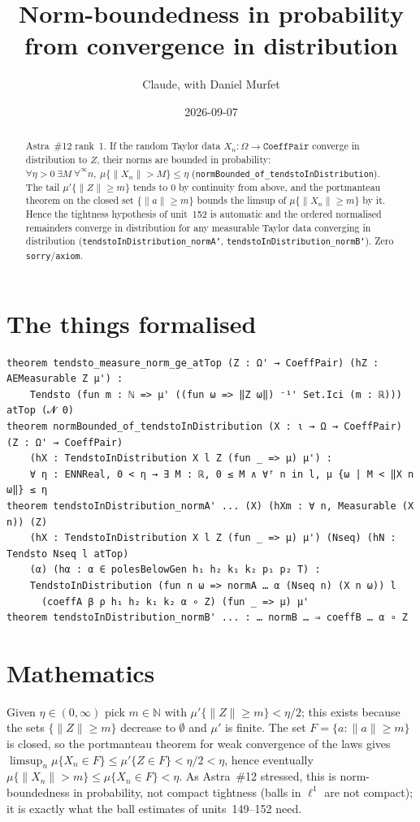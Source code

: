 \documentclass[11pt]{article}
\title{Norm-boundedness in probability from convergence in distribution}
\author{Claude, with Daniel Murfet}
\date{2026-09-07}
\begin{document}
\maketitle
\sloppy

\begin{abstract}
Astra~\#12 rank~1. If the random Taylor data $X_n\colon\Omega\to\texttt{CoeffPair}$ converge in
distribution to $Z$, their norms are bounded in probability:
$\forall\eta>0\ \exists M\ \forall^\infty n,\ \mu\{\|X_n\|>M\}\le\eta$
(\texttt{normBounded\_of\_tendstoInDistribution}). The tail $\mu'\{\|Z\|\ge m\}$ tends to $0$ by
continuity from above, and the portmanteau theorem on the closed set $\{\|a\|\ge m\}$ bounds the
limsup of $\mu\{\|X_n\|\ge m\}$ by it. Hence the tightness hypothesis of unit~152 is automatic and
the ordered normalised remainders converge in distribution for any measurable Taylor data
converging in distribution (\texttt{tendstoInDistribution\_normA'}, \texttt{tendstoInDistribution\_normB'}).
Zero \texttt{sorry}/\texttt{axiom}.
\end{abstract}

\section{The things formalised}
{\small
\begin{verbatim}
theorem tendsto_measure_norm_ge_atTop (Z : Ω' → CoeffPair) (hZ : AEMeasurable Z μ') :
    Tendsto (fun m : ℕ => μ' ((fun ω => ‖Z ω‖) ⁻¹' Set.Ici (m : ℝ))) atTop (𝓝 0)
theorem normBounded_of_tendstoInDistribution (X : ι → Ω → CoeffPair) (Z : Ω' → CoeffPair)
    (hX : TendstoInDistribution X l Z (fun _ => μ) μ') :
    ∀ η : ENNReal, 0 < η → ∃ M : ℝ, 0 ≤ M ∧ ∀ᶠ n in l, μ {ω | M < ‖X n ω‖} ≤ η
theorem tendstoInDistribution_normA' ... (X) (hXm : ∀ n, Measurable (X n)) (Z)
    (hX : TendstoInDistribution X l Z (fun _ => μ) μ') (Nseq) (hN : Tendsto Nseq l atTop)
    (α) (hα : α ∈ polesBelowGen h₁ h₂ k₁ k₂ p₁ p₂ T) :
    TendstoInDistribution (fun n ω => normA … α (Nseq n) (X n ω)) l
      (coeffA β ρ h₁ h₂ k₁ k₂ α ∘ Z) (fun _ => μ) μ'
theorem tendstoInDistribution_normB' ... : … normB … ⇒ coeffB … α ∘ Z
\end{verbatim}
}

\section{Mathematics}
Given $\eta\in(0,\infty)$ pick $m\in\mathbb N$ with $\mu'\{\|Z\|\ge m\}<\eta/2$; this exists because
the sets $\{\|Z\|\ge m\}$ decrease to $\emptyset$ and $\mu'$ is finite. The set
$F=\{a:\|a\|\ge m\}$ is closed, so the portmanteau theorem for weak convergence of the laws gives
$\limsup_n\mu\{X_n\in F\}\le\mu'\{Z\in F\}<\eta/2<\eta$, hence eventually $\mu\{\|X_n\|>m\}\le
\mu\{X_n\in F\}<\eta$. As Astra~\#12 stressed, this is norm-boundedness in probability, not
compact tightness (balls in $\ell^1$ are not compact); it is exactly what the ball estimates of
units~149--152 need.
\end{document}
